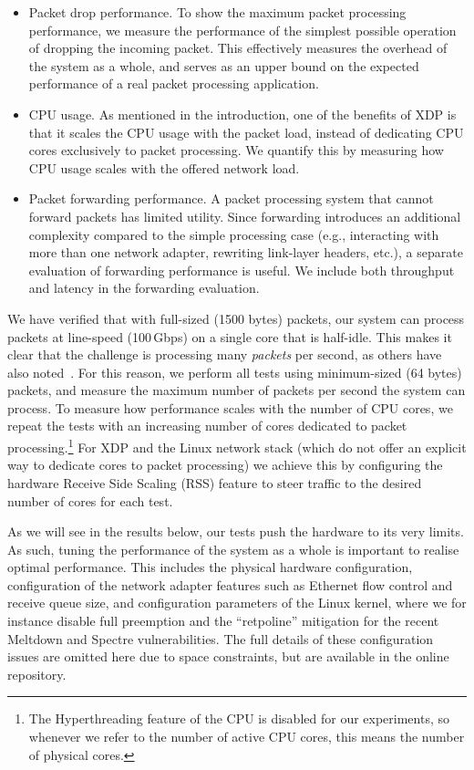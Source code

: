 \documentclass[sigconf]{acmart}
\begin{document}
\begin{itemize}
\item Packet drop performance. To show the maximum packet processing
  performance, we measure the performance of the simplest possible operation of
  dropping the incoming packet. This effectively measures the overhead of the
  system as a whole, and serves as an upper bound on the expected performance of
  a real packet processing application.

\item CPU usage. As mentioned in the introduction, one of the benefits of XDP is
  that it scales the CPU usage with the packet load, instead of dedicating CPU
  cores exclusively to packet processing. We quantify this by measuring how CPU
  usage scales with the offered network load.

\item Packet forwarding performance. A packet processing system that cannot
  forward packets has limited utility. Since forwarding introduces an additional
  complexity compared to the simple processing case (e.g., interacting with more
  than one network adapter, rewriting link-layer headers, etc.), a separate
  evaluation of forwarding performance is useful. We include both throughput and
  latency in the forwarding evaluation.
\end{itemize}

We have verified that with full-sized (1500 bytes) packets, our system can
process packets at line-speed (100\,Gbps) on a single core that is half-idle.
This makes it clear that the challenge is processing many \emph{packets} per
second, as others have also noted~\cite{rizzo2012netmap}. For this reason, we
perform all tests using minimum-sized (64 bytes) packets, and measure the
maximum number of packets per second the system can process. To measure how
performance scales with the number of CPU cores, we repeat the tests with an
increasing number of cores dedicated to packet processing.\footnote{The
  Hyperthreading feature of the CPU is disabled for our experiments, so whenever
  we refer to the number of active CPU cores, this means the number of physical
  cores.} For XDP and the Linux network stack (which do not offer an explicit
way to dedicate cores to packet processing) we achieve this by configuring the
hardware Receive Side Scaling (RSS) feature to steer traffic to the desired
number of cores for each test.

As we will see in the results below, our tests push the hardware to its very
limits. As such, tuning the performance of the system as a whole is important to
realise optimal performance. This includes the physical hardware configuration,
configuration of the network adapter features such as Ethernet flow control and
receive queue size, and configuration parameters of the Linux kernel, where we
for instance disable full preemption and the ``retpoline'' mitigation for the
recent Meltdown and Spectre vulnerabilities. The full details of these
configuration issues are omitted here due to space constraints, but are
available in the online repository.
\end{document}
